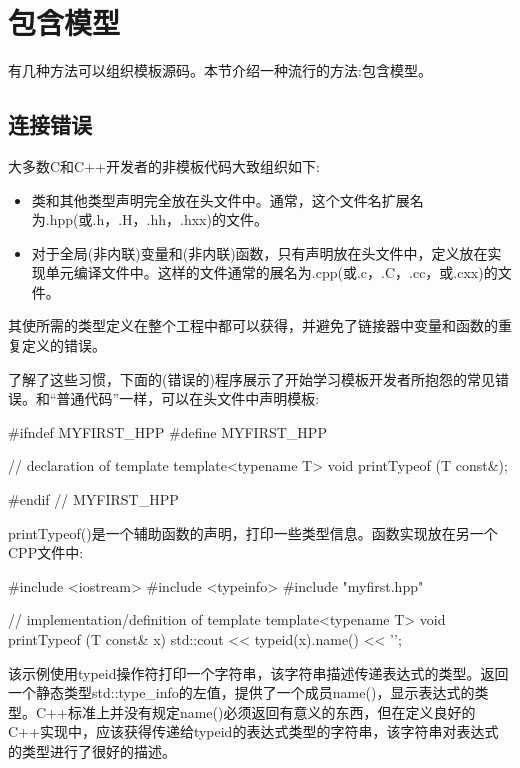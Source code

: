 \section{包含模型}


有几种方法可以组织模板源码。本节介绍一种流行的方法:包含模型。

\subsection{连接错误}

大多数C和C++开发者的非模板代码大致组织如下:

\begin{itemize}
\item
类和其他类型声明完全放在头文件中。通常，这个文件名扩展名为.hpp(或.h，.H，.hh，.hxx)的文件。

\item
对于全局(非内联)变量和(非内联)函数，只有声明放在头文件中，定义放在实现单元编译文件中。这样的文件通常的展名为.cpp(或.c，.C，.cc，或.cxx)的文件。
\end{itemize}

其使所需的类型定义在整个工程中都可以获得，并避免了链接器中变量和函数的重复定义的错误。

了解了这些习惯，下面的(错误的)程序展示了开始学习模板开发者所抱怨的常见错误。和“普通代码”一样，可以在头文件中声明模板:

\begin{cpp}
#ifndef MYFIRST_HPP
#define MYFIRST_HPP

// declaration of template
template<typename T>
void printTypeof (T const&);

#endif // MYFIRST_HPP
\end{cpp}

printTypeof()是一个辅助函数的声明，打印一些类型信息。函数实现放在另一个CPP文件中:

\begin{cpp}
#include <iostream>
#include <typeinfo>
#include "myfirst.hpp"

// implementation/definition of template
template<typename T>
void printTypeof (T const& x)
{
	std::cout << typeid(x).name() << '\n';
}
\end{cpp}

该示例使用typeid操作符打印一个字符串，该字符串描述传递表达式的类型。返回一个静态类型std::type\_info的左值，提供了一个成员name()，显示表达式的类型。C++标准上并没有规定name()必须返回有意义的东西，但在定义良好的C++实现中，应该获得传递给typeid的表达式类型的字符串，该字符串对表达式的类型进行了很好的描述。
 
